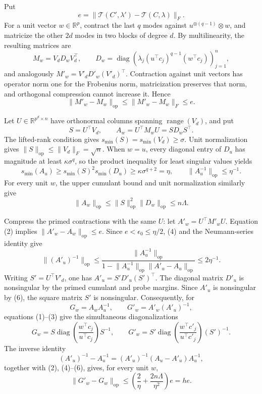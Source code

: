 Put
\[
 e=\lVert\mathcal T(C',\lambda')-\mathcal T(C,\lambda)\rVert_F.
\]
For a unit vector \(w\in\mathbb R^p\), contract the last \(q\) modes against \(u^{\otimes(q-1)}\otimes w\), and matricize the other \(2d\) modes in two blocks of degree \(d\). By multilinearity, the resulting matrices are
\[
 M_w=V_dD_wV_d^\top,
 \qquad
 D_w=\operatorname{diag}\!\left(
 \lambda_j(u^\top c_j)^{q-1}(w^\top c_j)
 \right)_{j=1}^n,
 \tag{1}
\]
and analogously \(M'_w=V'_dD'_w(V'_d)^\top\). Contraction against unit vectors has operator norm one for the Frobenius norm, matricization preserves that norm, and orthogonal compression cannot increase it. Hence
\[
 \lVert M'_w-M_w\rVert_{\mathrm{op}}
 \le \lVert M'_w-M_w\rVert_F\le e.
 \tag{2}
\]

Let \(U\in\mathbb R^{p^d\times n}\) have orthonormal columns spanning \(\operatorname{range}(V_d)\), and put
\[
 S=U^\top V_d,
 \qquad
 A_w=U^\top M_wU=SD_wS^\top.
 \tag{3}
\]
The lifted-rank condition gives \(s_{\min}(S)=s_{\min}(V_d)\ge\sigma\). Unit normalization gives \(\lVert S\rVert_{\mathrm{op}}\le\lVert V_d\rVert_F=\sqrt n\). When \(w=u\), every diagonal entry of \(D_u\) has magnitude at least \(\kappa\sigma^q\), so the product inequality for least singular values yields
\[
 s_{\min}(A_u)
 \ge s_{\min}(S)^2s_{\min}(D_u)
 \ge\kappa\sigma^{q+2}=\eta,
 \qquad
 \lVert A_u^{-1}\rVert_{\mathrm{op}}\le\eta^{-1}.
 \tag{4}
\]
For every unit \(w\), the upper cumulant bound and unit normalization similarly give
\[
 \lVert A_w\rVert_{\mathrm{op}}
 \le \lVert S\rVert_{\mathrm{op}}^2\lVert D_w\rVert_{\mathrm{op}}
 \le n\Lambda.
 \tag{5}
\]

Compress the primed contractions with the same \(U\): let \(A'_w=U^\top M'_wU\). Equation (2) implies \(\lVert A'_w-A_w\rVert_{\mathrm{op}}\le e\). Since \(e<\epsilon_0\le\eta/2\), (4) and the Neumann-series identity give
\[
 \lVert(A'_u)^{-1}\rVert_{\mathrm{op}}
 \le\frac{\lVert A_u^{-1}\rVert_{\mathrm{op}}}
 {1-\lVert A_u^{-1}\rVert_{\mathrm{op}}\lVert A'_u-A_u\rVert_{\mathrm{op}}}
 \le2\eta^{-1}.
 \tag{6}
\]
Writing \(S'=U^\top V'_d\), one has \(A'_u=S'D'_u(S')^\top\). The diagonal matrix \(D'_u\) is nonsingular by the primed cumulant and probe margins. Since \(A'_u\) is nonsingular by (6), the square matrix \(S'\) is nonsingular. Consequently, for
\[
 G_w=A_wA_u^{-1},
 \qquad
 G'_w=A'_w(A'_u)^{-1},
\]
equations (1)--(3) give the simultaneous diagonalizations
\[
 G_w=S\operatorname{diag}\!\left(\frac{w^\top c_j}{u^\top c_j}\right)S^{-1},
 \qquad
 G'_w=S'\operatorname{diag}\!\left(\frac{w^\top c'_j}{u^\top c'_j}\right)(S')^{-1}.
 \tag{7}
\]
The inverse identity
\[
 (A'_u)^{-1}-A_u^{-1}
 =(A'_u)^{-1}(A_u-A'_u)A_u^{-1},
\]
together with (2), (4)--(6), gives, for every unit \(w\),
\[
 \lVert G'_w-G_w\rVert_{\mathrm{op}}
 \le\left(\frac2\eta+\frac{2n\Lambda}{\eta^2}\right)e
 =he.
 \tag{8}
\]

